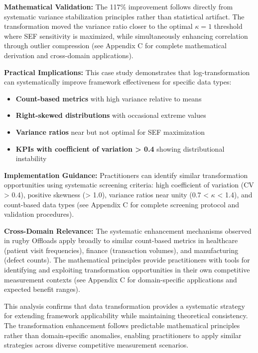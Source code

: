 \textbf{Mathematical Validation:} The 117\% improvement follows directly from systematic variance stabilization principles rather than statistical artifact. The transformation moved the variance ratio closer to the optimal $\kappa = 1$ threshold where SEF sensitivity is maximized, while simultaneously enhancing correlation through outlier compression (see Appendix C for complete mathematical derivation and cross-domain applications).

\textbf{Practical Implications:}
This case study demonstrates that log-transformation can systematically improve framework effectiveness for specific data types:

\begin{itemize}
    \item \textbf{Count-based metrics} with high variance relative to means
    \item \textbf{Right-skewed distributions} with occasional extreme values  
    \item \textbf{Variance ratios} near but not optimal for SEF maximization
    \item \textbf{KPIs with coefficient of variation > 0.4} showing distributional instability
\end{itemize}

\textbf{Implementation Guidance:} Practitioners can identify similar transformation opportunities using systematic screening criteria: high coefficient of variation (CV > 0.4), positive skewness (> 1.0), variance ratios near unity (0.7 < $\kappa$ < 1.4), and count-based data types (see Appendix C for complete screening protocol and validation procedures).

\textbf{Cross-Domain Relevance:} The systematic enhancement mechanisms observed in rugby Offloads apply broadly to similar count-based metrics in healthcare (patient visit frequencies), finance (transaction volumes), and manufacturing (defect counts). The mathematical principles provide practitioners with tools for identifying and exploiting transformation opportunities in their own competitive measurement contexts (see Appendix C for domain-specific applications and expected benefit ranges).

This analysis confirms that data transformation provides a systematic strategy for extending framework applicability while maintaining theoretical consistency. The transformation enhancement follows predictable mathematical principles rather than domain-specific anomalies, enabling practitioners to apply similar strategies across diverse competitive measurement scenarios.

